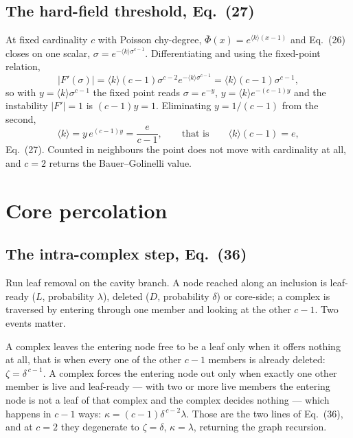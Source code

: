 \documentclass[aps,pre,onecolumn,superscriptaddress,floatfix,nofootinbib]{revtex4-2}
\newcommand{\ave}[1]{\langle #1 \rangle}
\begin{document}
\subsection{The hard-field threshold, Eq.~(27)}

At fixed cardinality $c$ with Poisson chy-degree, $\bar\Phi(x)=e^{\ave{k}(x-1)}$
and Eq.~(26) closes on one scalar, $\sigma=e^{-\ave{k}\sigma^{c-1}}$.
Differentiating and using the fixed-point relation,
\begin{equation}
  |F'(\sigma)|=\ave{k}(c-1)\sigma^{c-2}e^{-\ave{k}\sigma^{c-1}}
             =\ave{k}(c-1)\sigma^{c-1},
\end{equation}
so with $y=\ave{k}\sigma^{c-1}$ the fixed point reads $\sigma=e^{-y}$,
$y=\ave{k}e^{-(c-1)y}$ and the instability $|F'|=1$ is $(c-1)y=1$. Eliminating
$y=1/(c-1)$ from the second,
\begin{equation}
  \ave{k}=y\,e^{(c-1)y}=\frac{e}{c-1},
  \qquad\text{that is}\qquad \ave{k}(c-1)=e ,
\end{equation}
Eq.~(27). Counted in neighbours the point does not move with cardinality at all,
and $c=2$ returns the Bauer--Golinelli value.

\section{Core percolation}
\label{sec:core}

\subsection{The intra-complex step, Eq.~(36)}

Run leaf removal on the cavity branch. A node reached along an inclusion is
leaf-ready ($L$, probability $\lambda$), deleted ($D$, probability $\delta$) or
core-side; a complex is traversed by entering through one member and looking at
the other $c-1$. Two events matter.

A complex leaves the entering node free to be a leaf only when it offers nothing
at all, that is when every one of the other $c-1$ members is already deleted:
$\zeta=\delta^{\,c-1}$. A complex forces the entering node out only when exactly
one other member is live and leaf-ready --- with two or more live members the
entering node is not a leaf of that complex and the complex decides nothing ---
which happens in $c-1$ ways: $\kappa=(c-1)\delta^{\,c-2}\lambda$. Those are the
two lines of Eq.~(36), and at $c=2$ they degenerate to $\zeta=\delta$,
$\kappa=\lambda$, returning the graph recursion.
\end{document}
